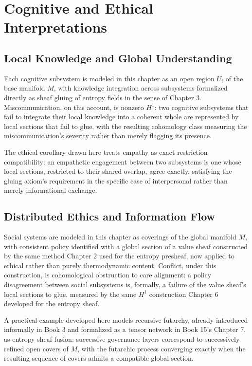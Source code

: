 \part{Cognitive and Ethical Interpretations}

\chapter{Local Knowledge and Global Understanding}

Each cognitive subsystem is modeled in this chapter as an open region $U_i$ of the base manifold $M$, with knowledge integration across subsystems formalized directly as sheaf gluing of entropy fields in the sense of Chapter 3. Miscommunication, on this account, is nonzero $H^1$: two cognitive subsystems that fail to integrate their local knowledge into a coherent whole are represented by local sections that fail to glue, with the resulting cohomology class measuring the miscommunication's severity rather than merely flagging its presence.

The ethical corollary drawn here treats empathy as exact restriction compatibility: an empathetic engagement between two subsystems is one whose local sections, restricted to their shared overlap, agree exactly, satisfying the gluing axiom's requirement in the specific case of interpersonal rather than merely informational exchange.

\chapter{Distributed Ethics and Information Flow}

Social systems are modeled in this chapter as coverings of the global manifold $M$, with consistent policy identified with a global section of a value sheaf constructed by the same method Chapter 2 used for the entropy presheaf, now applied to ethical rather than purely thermodynamic content. Conflict, under this construction, is cohomological obstruction to care alignment: a policy disagreement between social subsystems is, formally, a failure of the value sheaf's local sections to glue, measured by the same $H^1$ construction Chapter 6 developed for the entropy sheaf.

A practical example developed here models recursive futarchy, already introduced informally in Book 3 and formalized as a tensor network in Book 15's Chapter 7, as entropy sheaf fusion: successive governance layers correspond to successively refined open covers of $M$, with the futarchic process converging exactly when the resulting sequence of covers admits a compatible global section.

